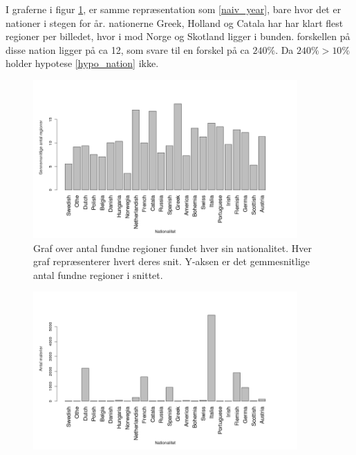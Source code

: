 I graferne i figur \ref{naiv_nation}, er samme repræsentation som
\ref{naiv_year}, bare hvor det er nationer i stegen for år. nationerne
Greek, Holland og Catala har har klart flest regioner per billedet, hvor
i mod Norge og Skotland ligger i bunden. forskellen på disse nation
ligger på ca 12, som svare til en forskel på ca $240\%$.
Da $240 \% > 10 \%$ holder hypotese \ref{hypo_nation} ikke.

\begin{figure}[!h]
	\begin{center}
		\includegraphics[angle=0,width=0.90\textwidth]{afsnit/resultater/billeder/nationcut.png}
	\end{center}
	\caption{Graf over antal fundne regioner fundet hver sin
       nationalitet. Hver graf repræsenterer hvert deres snit. Y-aksen
       er det gemmesnitlige antal fundne regioner i snittet.}
	\label{naiv_nation}
\end{figure}

\begin{figure}[!h]
	\begin{center}
		\includegraphics[angle=0,width=0.90\textwidth]{afsnit/resultater/billeder/nationNrImage.png}
	\end{center}
	\caption{}
	\label{naiv_nationNrImage}
\end{figure}

